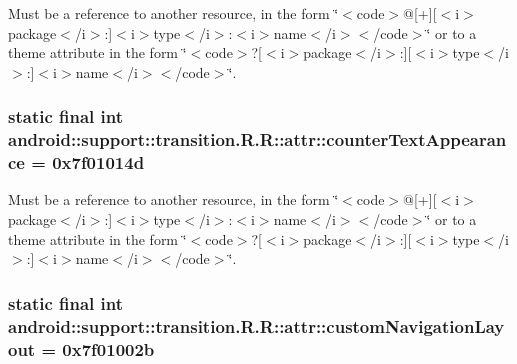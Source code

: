Must be a reference to another resource, in the form \char`\"{}$<$code$>$@\mbox{[}+\mbox{]}\mbox{[}$<$i$>$package$<$/i$>$:\mbox{]}$<$i$>$type$<$/i$>$:$<$i$>$name$<$/i$>$$<$/code$>$\char`\"{} or to a theme attribute in the form \char`\"{}$<$code$>$?\mbox{[}$<$i$>$package$<$/i$>$:\mbox{]}\mbox{[}$<$i$>$type$<$/i$>$:\mbox{]}$<$i$>$name$<$/i$>$$<$/code$>$\char`\"{}. \hypertarget{classandroid_1_1support_1_1transition_1_1_r_1_1attr_57a10b30704f0a56b6efdd6f855cbbe4}{
\subsubsection[{counterTextAppearance}]{\setlength{\rightskip}{0pt plus 5cm}static final int android::support::transition.R.R::attr::counterTextAppearance = 0x7f01014d}}
\label{classandroid_1_1support_1_1transition_1_1_r_1_1attr_57a10b30704f0a56b6efdd6f855cbbe4}


Must be a reference to another resource, in the form \char`\"{}$<$code$>$@\mbox{[}+\mbox{]}\mbox{[}$<$i$>$package$<$/i$>$:\mbox{]}$<$i$>$type$<$/i$>$:$<$i$>$name$<$/i$>$$<$/code$>$\char`\"{} or to a theme attribute in the form \char`\"{}$<$code$>$?\mbox{[}$<$i$>$package$<$/i$>$:\mbox{]}\mbox{[}$<$i$>$type$<$/i$>$:\mbox{]}$<$i$>$name$<$/i$>$$<$/code$>$\char`\"{}. \hypertarget{classandroid_1_1support_1_1transition_1_1_r_1_1attr_061df5a544da4f07cf140d1818fdc52e}{
\subsubsection[{customNavigationLayout}]{\setlength{\rightskip}{0pt plus 5cm}static final int android::support::transition.R.R::attr::customNavigationLayout = 0x7f01002b}}
\label{classandroid_1_1support_1_1transition_1_1_r_1_1attr_061df5a544da4f07cf140d1818fdc52e}


